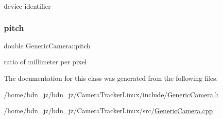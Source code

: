 device identifier 

\mbox{\label{class_generic_camera_a565f94ee10ad6333ca6e59a2fe8d32bb}} 
\subsubsection{\texorpdfstring{pitch}{pitch}}
{\footnotesize\ttfamily double Generic\+Camera\+::pitch\hspace{0.3cm}{\ttfamily [protected]}}



ratio of millimeter per pixel 



The documentation for this class was generated from the following files\+:\begin{DoxyCompactItemize}
\item 
/home/bdn\+\_\+jz/bdn\+\_\+jz/\+Camera\+Tracker\+Linux/include/\hyperlink{_generic_camera_8h}{Generic\+Camera.\+h}\item 
/home/bdn\+\_\+jz/bdn\+\_\+jz/\+Camera\+Tracker\+Linux/src/\hyperlink{_generic_camera_8cpp}{Generic\+Camera.\+cpp}\end{DoxyCompactItemize}
